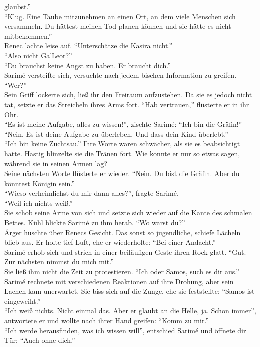 glaubst.''\\
``Klug. Eine Taube mitzunehmen an einen Ort, an dem viele Menschen sich versammeln. Du hättest 
meinen Tod planen können und sie hätte es nicht mitbekommen.''\\
Renec lachte leise auf. ``Unterschätze die Kasira nicht.''\\
``Also nicht Ga'Leor?''\\
``Du brauchst keine Angst zu haben. Er braucht dich.''\\
Sarimé versteifte sich, versuchte nach jedem bischen Information zu greifen. ``Wer?''\\
Sein Griff lockerte sich, ließ ihr den Freiraum aufzustehen. Da sie es jedoch nicht tat, setzte er 
das Streicheln ihres Arms fort. ``Hab vertrauen,'' flüsterte er in ihr Ohr.\\
``Es ist meine Aufgabe, alles zu wissen!'', zischte Sarimé: ``Ich bin die Gräfin!''\\
``Nein. Es ist deine Aufgabe zu überleben. Und dass dein Kind überlebt.''\\
``Ich bin keine Zuchtsau.'' Ihre Worte waren schwächer, als sie es beabsichtigt hatte. Hastig 
blinzelte sie die Tränen fort. Wie konnte er nur so etwas sagen, während sie in seinen Armen lag?\\
Seine nächsten Worte flüsterte er wieder. ``Nein. Du bist die Gräfin. Aber du könntest Königin 
sein.''\\
``Wieso verheimlichst du mir dann alles?'', fragte Sarimé.\\
``Weil ich nichts weiß.''\\
Sie schob seine Arme von sich und setzte sich wieder auf die Kante des schmalen Bettes. Kühl 
blickte Sarimé zu ihm herab. ``Wo warst du?''\\
Ärger huschte über Renecs  Gesicht. Das sonst so jugendliche, schiefe Lächeln blieb aus. Er holte 
tief Luft, ehe er wiederholte: ``Bei einer Andacht.''\\
Sarimé erhob sich und strich in einer beiläufigen Geste ihren Rock glatt. ``Gut. Zur nächsten 
nimmst du mich mit.''\\
Sie ließ ihm nicht die Zeit zu protestieren. ``Ich oder Samos, such es dir aus.''\\
Sarimé rechnete mit verschiedenen Reaktionen auf ihre Drohung, aber sein Lachen kam unerwartet. Sie 
biss sich auf die Zunge, ehe sie feststellte: ``Samos ist eingeweiht.''\\
``Ich weiß nichts. Nicht einmal das. Aber er glaubt an die Helle, ja. Schon immer'', antwortete 
er und wollte nach ihrer Hand greifen: ``Komm zu mir.''\\
``Ich werde herausfinden, was ich wissen will'', entschied Sarimé und öffnete dir Tür: ``Auch ohne 
dich.''\\








